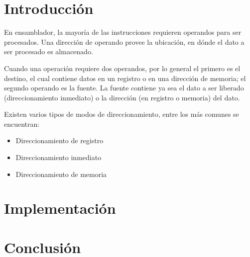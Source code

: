     \restoregeometry %

    \clearpage
    \tableofcontents

    \clearpage

    \clearpage

    \lstlistoflistings

    \clearpage
    \vspace*{6pt}
	\centerline{\textbf{\huge \theTitle}}
    \vspace*{8pt}


	\section{Introducción}

	En ensamblador, la mayoría de las instrucciones requieren operandos para ser
	procesados. Una dirección de operando provee la ubicación, en dónde el dato
	a ser procesado es almacenado.

	Cuando una operación requiere dos operandos, por lo general el primero es el
	destino, el cual contiene datos en un registro o en una dirección de
	memoria; el segundo operando es la fuente. La fuente contiene ya sea el dato
	a ser liberado (direccionamiento inmediato) o la dirección (en registro o
	memoria) del dato.

	Existen varios tipos de modos de direccionamiento, entre los más comunes se
	encuentran:

	\begin{itemize}
		\item Direccionamiento de registro
		\item Direccionamiento inmediato
		\item Direccionamiento de memoria
	\end{itemize}

	\clearpage
	\section{Implementación}

	

	\clearpage
	\section{Conclusión}

